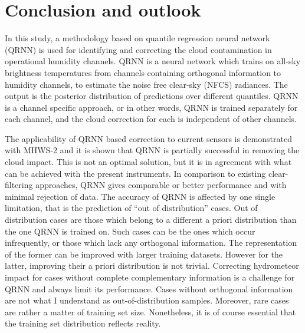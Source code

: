 \documentclass[amt, manuscript]{copernicus}
\newcommand{\todo}[1]{{\color{red} #1}}
\begin{document}
\section{Conclusion and outlook}  %
\label{conclusions}
%

In this study, a methodology based on quantile regression neural network (QRNN) is used for identifying and correcting the cloud contamination in operational humidity channels. QRNN is a neural network which trains on all-sky brightness temperatures from  channels containing orthogonal information to humidity channels, to estimate the noise free clear-sky (NFCS) radiances. The output is the posterior distribution of predictions over different quantiles. QRNN is a channel specific approach, or in other words, QRNN is trained separately for each channel, and the cloud correction for each is independent of other channels. 
 
The applicability of QRNN based correction to current sensors is demonstrated with MHWS-2 and it is shown that QRNN is partially successful in removing the cloud impact. This is not  an optimal solution, but it is in agreement with what can be achieved with the present instruments. In comparison to existing clear-filtering approaches, QRNN gives comparable or better performance and with minimal rejection of data. The accuracy of QRNN is affected by one single limitation, that is the prediction of ``out of distribution'' cases. Out of distribution cases are those which belong to a different a priori distribution than the one QRNN is trained on. Such cases can be the ones which occur infrequently, or those which lack any orthogonal information. The representation of the former can be improved with larger training datasets. However for the latter, improving their a priori distribution is not trivial. Correcting hydrometeor impact for cases without complete complementary information is a challenge for QRNN and always limit its performance. \todo{Cases without orthogonal information are not what I understand as out-of-distribution samples. Moreover, rare cases are rather a matter of training set size. Nonetheless, it is of course essential that
  the training set distribution reflects reality.}
\end{document}
